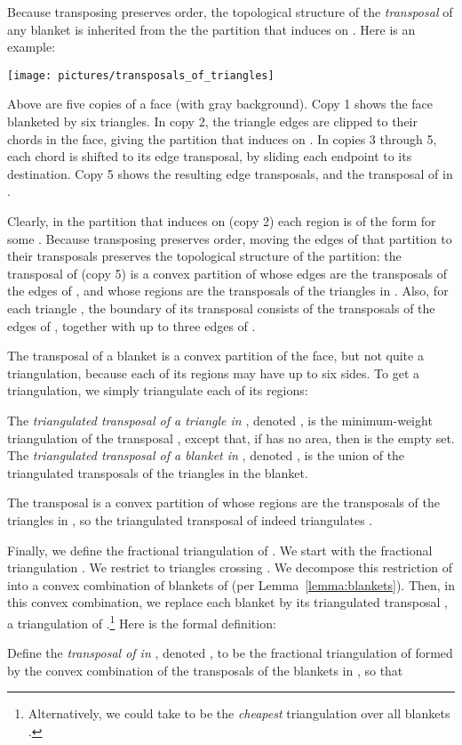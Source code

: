 \documentclass[final]{siamltex}
\begin{document}
Because transposing preserves order, 
the topological structure of the {\em transposal} of any blanket 
is inherited from the the partition that  induces on .
Here is an example:

\noindent\texttt{[image: pictures/transposals\_of\_triangles]}

Above are five copies of a face  (with gray background).
Copy 1 shows the face blanketed by six triangles.
In copy 2, the triangle edges are clipped to their chords in the face,
giving the partition that  induces on .
In copies 3 through 5, each chord is shifted to its edge transposal,
by sliding each endpoint to its destination.
Copy 5 shows the resulting edge transposals,
and the transposal of  in .

Clearly, in the partition that  induces on  (copy 2)
each region is of the form  for some .
Because transposing preserves order, moving the edges of that partition
to their transposals preserves the topological structure of the partition:
the transposal  of  (copy 5)
is a convex partition of 
whose edges are the transposals of the edges of ,
and whose regions are the transposals of the triangles in .
Also, for each triangle ,
the boundary of its transposal 
consists of the transposals of the edges of ,
together with up to three edges of .

The transposal of a blanket is a convex partition of the face,
but not quite a triangulation, because each of its regions may have up to six sides.
To get a triangulation, we simply triangulate each of its regions:

\begin{definition}
The {\em triangulated transposal of a triangle  in },
denoted ,
is the minimum-weight triangulation of the transposal ,
except that, if   has no area, then 
is the empty set.
The {\em triangulated transposal of a blanket  in },
denoted ,
is the union of the triangulated transposals of the triangles in the blanket.
\end{definition}

The transposal  is a convex partition of 
whose regions are the transposals of the triangles in ,
so the triangulated transposal of  indeed triangulates .

Finally, we define the fractional triangulation  of .
We start with the fractional triangulation .
We restrict  to triangles crossing .
We decompose this restriction of 
into a convex combination of blankets of 
(per Lemma~\ref{lemma:blankets}).
Then, in this convex combination, we replace each blanket 
by its triangulated transposal , a triangulation of .\footnote
{Alternatively, we could take  to be
the {\em cheapest} triangulation  
over all blankets .}
Here is the formal definition:
\begin{definition}
  \label{def:triangulation_transposal}
  Define the {\em transposal of  in },
  denoted , 
  to be the fractional triangulation of 
  formed by the convex combination 
  of the transposals of the blankets in , so that
  
\end{definition}
\end{document}
